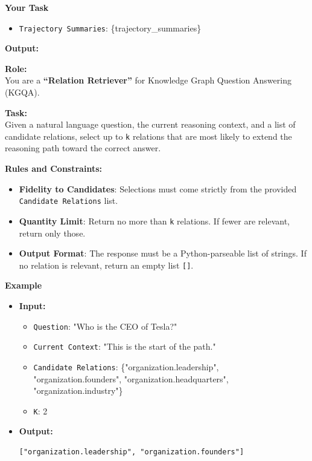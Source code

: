 \begin{tcolorbox}[title=Prompt Template for Exploration Pattern Extraction, colback=white, colframe=black!75, boxrule=0.5pt, arc=2mm]
\textbf{Your Task}
\begin{itemize}[leftmargin=1.5em, itemsep=0pt, topsep=2pt]
    \item \texttt{Trajectory Summaries}: \{trajectory\_summaries\}
\end{itemize}

\textbf{Output:}
\end{tcolorbox}
\label{fig:prompt_exploration_patterns}


\begin{tcolorbox}[title=Prompt Template for Candidate Retrieval (Dual-Feedback Stage 1), colback=white, colframe=black!75, boxrule=0.5pt, arc=2mm]

\textbf{Role:} \\
You are a \textbf{“Relation Retriever”} for Knowledge Graph Question Answering (KGQA).

\textbf{Task:} \\
Given a natural language question, the current reasoning context, and a list of candidate relations, select up to \texttt{k} relations that are most likely to extend the reasoning path toward the correct answer.

\textbf{Rules and Constraints:}
\begin{itemize}[leftmargin=1.5em, itemsep=0pt, topsep=0pt]
    \item \textbf{Fidelity to Candidates}: Selections must come strictly from the provided \texttt{Candidate Relations} list.
    \item \textbf{Quantity Limit}: Return no more than \texttt{k} relations. If fewer are relevant, return only those.
    \item \textbf{Output Format}: The response must be a Python-parseable list of strings. If no relation is relevant, return an empty list \texttt{[]}.
\end{itemize}

\textbf{Example}
\begin{itemize}[leftmargin=1.5em, itemsep=0pt, topsep=2pt]
    \item \textbf{Input:}
    \begin{itemize}
        \item \texttt{Question}: "Who is the CEO of Tesla?"
        \item \texttt{Current Context}: "This is the start of the path."
        \item \texttt{Candidate Relations}: \{"organization.leadership", "organization.founders", "organization.headquarters", "organization.industry"\}
        \item \texttt{K}: 2
    \end{itemize}
    \item \textbf{Output:}
\begin{verbatim}
["organization.leadership", "organization.founders"]
\end{verbatim}
\end{itemize}


\end{tcolorbox}
